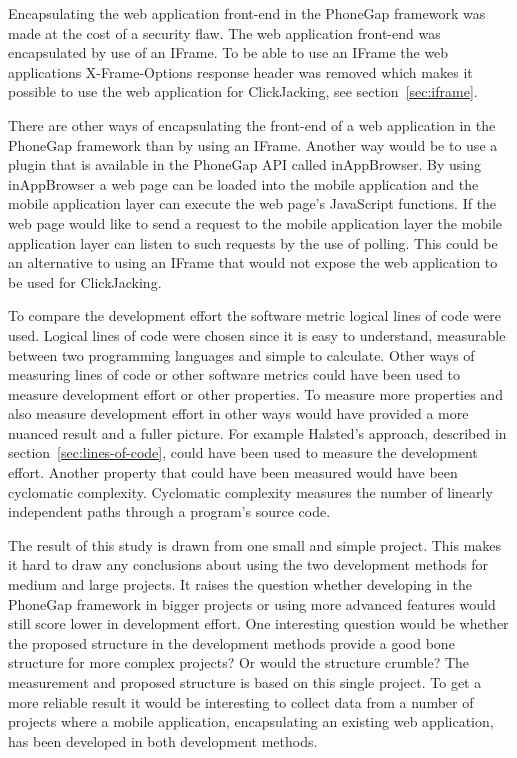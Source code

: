 Encapsulating the web application front-end in the PhoneGap framework was made at the cost of a security flaw. The web application front-end was encapsulated by use of an IFrame. To be able to use an IFrame the web applications X-Frame-Options response header was removed which makes it possible to use the web application for ClickJacking, see section~\ref{sec:iframe}. 

There are other ways of encapsulating the front-end of a web application in the PhoneGap framework than by using an IFrame. Another way would be to use a plugin that is available in the PhoneGap API called inAppBrowser. By using inAppBrowser a web page can be loaded into the mobile application and the mobile application layer can execute the web page’s JavaScript functions. If the web page would like to send a request to the mobile application layer the mobile application layer can listen to such requests by the use of polling.  This could be an alternative to using an IFrame that would not expose the web application to be used for ClickJacking. 

To compare the development effort the software metric logical lines of code were used. Logical lines of code were chosen since it is easy to understand, measurable between two programming languages and simple to calculate. Other ways of measuring lines of code or other software metrics could have been used to measure development effort or other properties. To measure more properties and also measure development effort in other ways would have provided a more nuanced result and a fuller picture. For example Halsted's approach, described in section~\ref{sec:lines-of-code}, could have been used to measure the development effort. Another property that could have been measured would have been cyclomatic complexity. Cyclomatic complexity measures the number of linearly independent paths through a program’s source code. 

The result of this study is drawn from one small and simple project. This makes it hard to draw any conclusions about using the two development methods for medium and large projects. It raises the question whether developing in the PhoneGap framework in bigger projects or using more advanced features would still score lower in development effort. One interesting question would be whether the proposed structure in the development methods provide a good bone structure for more complex projects? Or would the structure crumble? The measurement and proposed structure is based on this single project. To get a more reliable result it would be interesting to collect data from a number of projects where a mobile application, encapsulating an existing web application, has been developed in both development methods.

